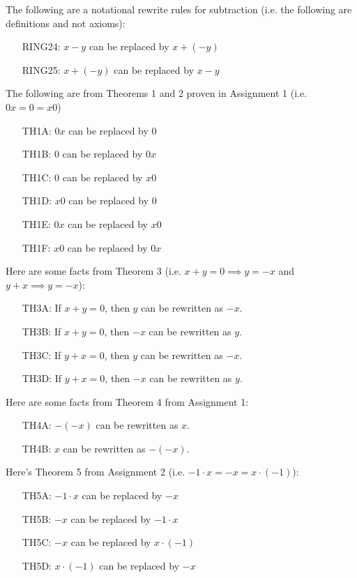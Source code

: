 \documentclass[a4paper,12pt]{article}
\begin{document}
The following are a notational rewrite rules for subtraction
(i.e. the following are definitions and not axioms):
\begin{enumerate}[leftmargin=\LISTMARGIN]
\item[RING24:] $x - y$ can be replaced by $x + (-y)$
\item[RING25:] $x + (-y)$ can be replaced by $x - y$
\end{enumerate}

The following are from Theorems 1 and 2 proven in Assignment 1 (i.e.
$0x = 0 = x0$)
\begin{enumerate}[leftmargin=\LISTMARGIN]
\item[TH1A:] $0x$ can be replaced by $0$
\item[TH1B:] $0$ can be replaced by $0x$
\item[TH1C:] $0$ can be replaced by $x0$
\item[TH1D:] $x0$ can be replaced by $0$
\item[TH1E:] $0x$ can be replaced by $x0$
\item[TH1F:] $x0$ can be replaced by $0x$
\end{enumerate}

Here are some facts from Theorem 3 (i.e. $x+y = 0 \implies y = -x$ and
$y + x \implies y=-x$):
\begin{enumerate}[leftmargin=\LISTMARGIN]
\item[TH3A:] If $x+y=0$, then $y$ can be rewritten as $-x$.
\item[TH3B:] If $x+y=0$, then $-x$ can be rewritten as $y$.
\item[TH3C:] If $y+x=0$, then $y$ can be rewritten as $-x$.
\item[TH3D:] If $y+x=0$, then $-x$ can be rewritten as $y$.
\end{enumerate}

Here are some facts from Theorem 4 from Assignment 1:
\begin{enumerate}[leftmargin=\LISTMARGIN]
\item[TH4A:] $-(-x)$ can be rewritten as $x$.
\item[TH4B:] $x$ can be rewritten as $-(-x)$.
\end{enumerate}

Here's Theorem 5 from Assignment 2 (i.e. $-1 \cdot x = -x = x \cdot (-1)$):
\begin{enumerate}[leftmargin=\LISTMARGIN]
\item[TH5A:] $-1 \cdot x$ can be replaced by $-x$
\item[TH5B:] $-x$ can be replaced by $-1 \cdot x$
\item[TH5C:] $-x$ can be replaced by $x \cdot (-1)$
\item[TH5D:] $x \cdot (-1)$ can be replaced by $-x$ 
\end{enumerate}
\end{document}
